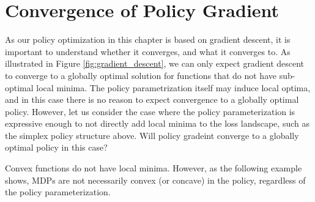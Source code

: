 \section{Convergence of Policy Gradient}

As our policy optimization in this chapter is based on gradient descent, it is important to understand whether it converges, and what it converges to. As illustrated in Figure \ref{fig:gradient_descent}, we can only expect gradient descent to converge to a globally optimal solution for functions that do not have sub-optimal local minima. The policy parametrization itself may induce local optima, and in this case there is no reason to expect convergence to a globally optimal policy. However, let us consider the case where the policy parameterization is expressive enough to not directly add local minima to the loss landscape, such as the simplex policy structure above. Will policy gradeint converge to a globally optimal policy in this case?

Convex functions do not have local minima. However, as the following example shows, MDPs are not necessarily convex (or concave) in the policy, regardless of the policy parameterization.


